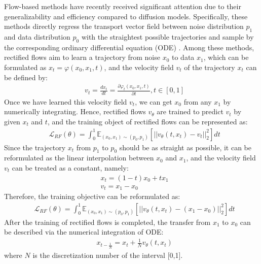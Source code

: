 \label{sec:preliminaries}
Flow-based methods \cite{liu2022flow,lipman2022flow,esser2024scaling,ma2024sit,fei2024flux,polyak2024moviegencastmedia} have recently received significant attention due to their generalizability and efficiency compared to diffusion models. Specifically,
these methods directly regress the transport vector field between noise distribution $p_1$ and data distribution $p_0$ with the straightest possible trajectories and sample by the corresponding ordinary differential equation (ODE) \cite{wang2024frieren}. Among these methods, rectified flows \cite{liu2022flow,lipman2022flow} aim to learn a trajectory from noise $x_0$ to data $x_1$, which can be formulated as $x_t = \varphi(x_0,x_1,t)$, and the velocity field $v_t$ of the trajectory $x_t$ can be defined by:
\begin{align}
& v_t = \frac{dx_t}{dt} = \frac{\partial\varphi_t(x_0,x_1,t)}{\partial t}, t\in[0,1]
\end{align}
Once we have learned this velocity field $v_t$, we can get $x_0$ from any $x_1$ by numerically integrating. Hence, rectified flows $v_\theta$ are trained to predict $v_t$ by given $x_t$ and $t$, and the training object of rectified flows can be represented as:
\begin{align}
&\mathcal L_{RF}(\theta) = \int^1_0 \mathbb{E}_{(x_0,x_1)\sim(p_0,p_1)}[||v_\theta(t, x_t)-v_t||^2_2]dt
\end{align}
Since the trajectory $x_t$ from $p_1$ to $p_0$ should be as straight as possible, it can be reformulated as the linear interpolation between $x_0$ and $x_1$, and the velocity field $v_t$ can be treated as a constant, namely:
\begin{align}
& x_t = (1-t)x_0 + tx_1 \\
& v_t = x_1 - x_0
\end{align}
Therefore, the training objective can be reformulated as:
\begin{align}
&\mathcal L_{RF}(\theta) = \int^1_0 \mathbb{E}_{(x_0,x_1)\sim(p_0,p_1)}[||v_\theta(t, x_t)-(x_1-x_0)||^2_2]dt
\end{align}
After the training of rectified flows is completed, the transfer from $x_1$ to $x_0$ can be described via the numerical integration of ODE:
\begin{align}
& x_{t-\frac{1}{N}} = x_t + \frac{1}{N}v_\theta(t,x_t)
\end{align}
where $N$ is the discretization number of the interval [0,1].


